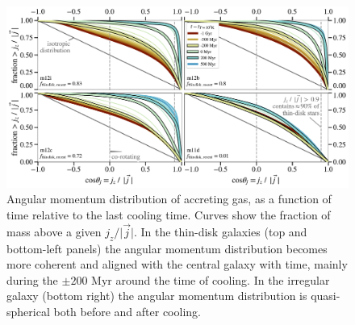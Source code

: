 \documentclass[fleqn,usenatbib]{mnras}
\begin{document}

\begin{figure}
    \centering
    \includegraphics[width=\textwidth]{figures/jzjmag_vs_t.pdf}
    \caption{
    Angular momentum distribution of accreting gas, as a function of time relative to the last cooling time.
    Curves show the fraction of mass above a given $j_z / \vert \vec j \vert$. 
    In the thin-disk galaxies (top and bottom-left panels) the angular momentum distribution becomes more coherent and aligned with the central galaxy with time, mainly during the $\pm200$ Myr around the time of cooling.
    In the irregular galaxy (bottom right) the angular momentum distribution is quasi-spherical both before and after cooling. 
    }
    \label{f: coherence}
\end{figure}
\end{document}
